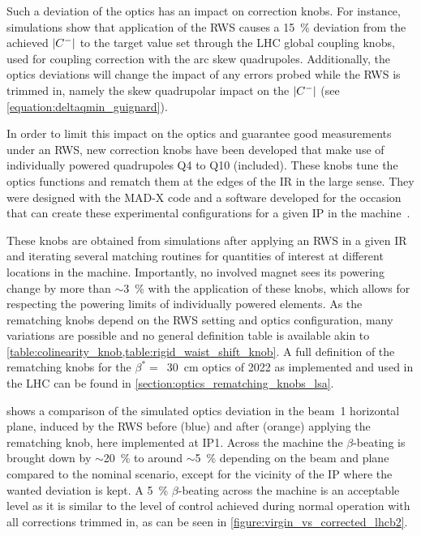 Such a deviation of the optics has an impact on correction knobs.
For instance, simulations show that application of the RWS causes a \qty{15}{\percent} deviation from the achieved \(\left\lvert C^{-} \right\rvert\) to the target value set through the LHC global coupling knobs, used for coupling correction with the arc skew quadrupoles.
Additionally, the optics deviations will change the impact of any errors probed while the RWS is trimmed in, namely the skew quadrupolar impact on the \(\left\lvert C^{-} \right\rvert\) (see \cref{equation:deltaqmin_guignard}).
\newline

In order to limit this impact on the optics and guarantee good measurements under an RWS, new correction knobs have been developed that make use of individually powered quadrupoles Q\num{4} to Q\num{10} (included). 
These knobs tune the optics functions and rematch them at the edges of the IR in the large sense.
They were designed with the MAD-X code and a software developed for the occasion that can create these experimental configurations for a given IP in the machine~\cite{CODE:Soubelet:pyrws}.

These knobs are obtained from simulations after applying an RWS in a given IR and iterating several matching routines for quantities of interest at different locations in the machine.
Importantly, no involved magnet sees its powering change by more than \(\sim\)\qty{3}{\percent} with the application of these knobs, which allows for respecting the powering limits of individually powered elements.
As the rematching knobs depend on the RWS setting and optics configuration, many variations are possible and no general definition table is available akin to \cref{table:colinearity_knob,table:rigid_waist_shift_knob}.
A full definition of the rematching knobs for the \(\beta^{\ast} =\)~\qty{30}{\centi\meter} optics of 2022 as implemented and used in the LHC can be found in \cref{section:optics_rematching_knobs_lsa}.

 shows a comparison of the simulated optics deviation in the beam~\num{1} horizontal plane, induced by the RWS before (\textcolor{mplblue}{blue}) and after (\textcolor{mplorange}{orange}) applying the rematching knob, here implemented at IP\num{1}.
Across the machine the \(\beta\)-beating is brought down by \(\sim\)\qty{20}{\percent} to around \(\sim\)\qty{5}{\percent} depending on the beam and plane compared to the nominal scenario, except for the vicinity of the IP where the wanted deviation is kept.
A \qty{5}{\percent} \(\beta\)-beating across the machine is an acceptable level as it is similar to the level of control achieved during normal operation with all corrections trimmed in, as can be seen in \cref{figure:virgin_vs_corrected_lhcb2}.

